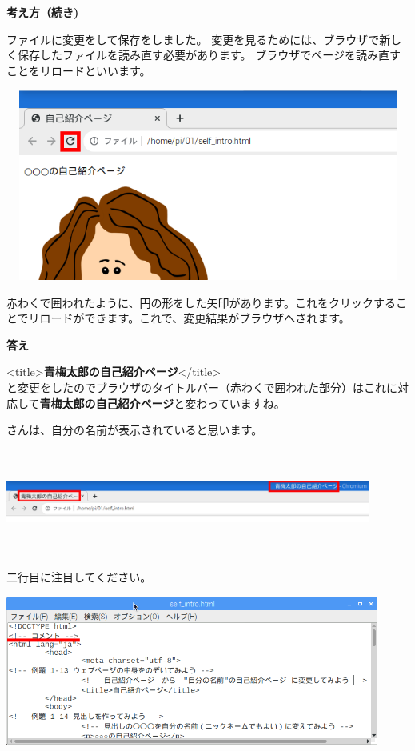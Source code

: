\documentclass[a4paper,12pt]{jarticle}
\begin{document}
\clearpage
\flushleft
\textbf{考え方（続き)}




ファイルに変更をして保存をしました。
変更を見るためには、ブラウザで新しく保存したファイルを読み直す必要があります。
ブラウザでページを読み直すことをリロードといいます。


\bigskip


\bigskip
\centering
\includegraphics[width=13.665cm,height=6.287cm]{textbook-img149.png}

\flushleft
赤わくで囲われたように、円の形をした矢印があります。これをクリックすることでリロードができます。これで、変更結果がブラウザへされます。

\vfill
\clearpage
\textbf{答え}


{\textless}title{\textgreater}\textbf{青梅太郎の自己紹介ページ}{\textless}/title{\textgreater}\\
と変更をしたのでブラウザのタイトルバー（赤わくで囲われた部分）はこれに対応して\textbf{青梅太郎の自己紹介ページ}と変わっていますね。

さんは、自分の名前が表示されていると思います。

\centering
\includegraphics[width=12.006cm,height=3.482cm]{textbook-img152.png}
\flushleft


二行目に注目してください。

\centering
\includegraphics[width=12.273cm,height=4.909cm]{textbook-img151.png}
\flushleft
\end{document}

